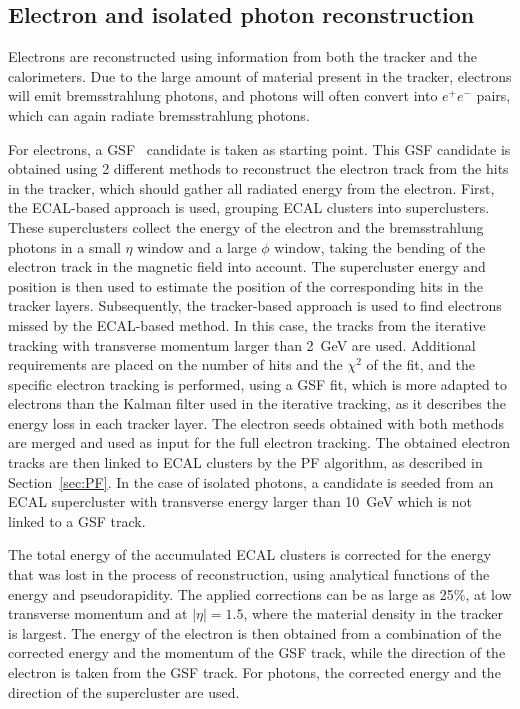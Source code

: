 \subsection{Electron and isolated photon reconstruction}
\label{sec:electron_reconstruction}

Electrons are reconstructed using information from both the tracker and the calorimeters. Due to the large amount of material present in the tracker, electrons will emit bremsstrahlung photons, and photons will often convert into $e^+e^-$ pairs, which can again radiate bremsstrahlung photons.

For electrons, a \ac{GSF}~\cite{Strandlie:2006gi} candidate is taken as starting point. This \ac{GSF} candidate is obtained using 2 different methods to reconstruct the electron track from the hits in the tracker, which should gather all radiated energy from the electron. First, the ECAL-based approach is used, grouping \ac{ECAL} clusters into superclusters. These superclusters collect the energy of the electron and the bremsstrahlung photons in a small $\eta$ window and a large $\phi$ window, taking the bending of the electron track in the magnetic field into account. The supercluster energy and position is then used to estimate the position of the corresponding hits in the tracker layers. Subsequently, the tracker-based approach is used to find electrons missed by the ECAL-based method. In this case, the tracks from the iterative tracking with transverse momentum larger than \SI{2}{GeV} are used. Additional requirements are placed on the number of hits and the $\chi^2$ of the fit, and the specific electron tracking is performed, using a \ac{GSF} fit, which is more adapted to electrons than the Kalman filter used in the iterative tracking, as it describes the energy loss in each tracker layer. The electron seeds obtained with both methods are merged and used as input for the full electron tracking. The obtained electron tracks are then linked to \ac{ECAL} clusters by the \ac{PF} algorithm, as described in Section~\ref{sec:PF}. In the case of isolated photons, a candidate is seeded from an \ac{ECAL} supercluster with transverse energy larger than \SI{10}{GeV} which is not linked to a \ac{GSF} track.

The total energy of the accumulated \ac{ECAL} clusters is corrected for the energy that was lost in the process of reconstruction, using analytical functions of the energy and pseudorapidity. The applied corrections can be as large as 25\%, at low transverse momentum and at $|\eta| = 1.5$, where the material density in the tracker is largest. The energy of the electron is then obtained from a combination of the corrected energy and the momentum of the \ac{GSF} track, while the direction of the electron is taken from the \ac{GSF} track. For photons, the corrected energy and the direction of the supercluster are used.
% 

